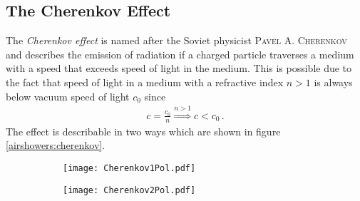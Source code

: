 \subsection{The Cherenkov Effect}\label{sec:intro:cherenkov}

The \textit{Cherenkov effect} is named after the Soviet physicist \textsc{Pavel A. Cherenkov} and describes the emission of radiation if a charged particle traverses a medium with a speed that exceeds speed of light in the medium. \cite{airshowers:cherenkov} This is possible due to the fact that speed of light in a medium with a refractive index $n > 1$ is always below vacuum speed of light $c_0$ since
\begin{align}
c = \frac{c_0}{n} \overset{n>1}{\Rightarrow} c < c_0\,.
\end{align} 
The effect is describable in two ways which are shown in figure \ref{airshowers:cherenkov}.
\begin{figure}[H]
	\centering
	\begin{subfigure}[t]{0.45\textwidth}
		\texttt{[image: Cherenkov1Pol.pdf]}
		\label{airshowers:cherenkov1pol}
	\end{subfigure}
	\hfill
	\begin{subfigure}[t]{0.45\textwidth}
		\texttt{[image: Cherenkov2Pol.pdf]}
		\label{airshowers:cherenkov2pol}
	\end{subfigure}
\end{figure}
